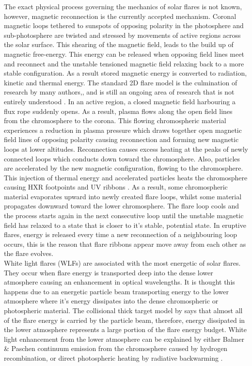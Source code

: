 The exact physical process governing the mechanics of solar flares is not known, however, magnetic reconnection is the currently accepted mechanism. Coronal magnetic loops tethered to sunspots of opposing polarity in the photosphere and sub-photosphere are twisted and stressed by movements of active regions across the solar surface. This shearing of the magnetic field, leads to the build up of magnetic free-energy. This energy can be released when opposing field lines meet and reconnect and the unstable tensioned magnetic field relaxing back to a more stable configuration. As a result stored magnetic energy is converted to radiation, kinetic and thermal energy. The standard 2D flare model is the culmination of research by many authors,\citep{1964NASSP..50..451C, 1966Natur.211..695S, 1974SoPh...34..323H, 1976SoPh...50...85K}, and is still an ongoing area of research that is not entirely understood \citep{2011LRSP....8....6S}. In an active region, a closed magnetic field harbouring a flux rope suddenly opens. As a result, plasma flows along the open field lines from the chromosphere to the corona. This flowing chromospheric material experiences a reduction in plasma pressure which draws together open magnetic field lines of opposing polarity causing reconnection and forming new magnetic loops at lower altitudes. Reconnection causes excess heating at the peaks of newly connected loops which conducts down toward the chromosphere. Also, particles are accelerated by the new magnetic configuration, flowing to the chromosphere. This injection of thermal energy and accelerated particles heats the chromosphere causing HXR footpoints \citep{1995ApJ...455..347A} and UV ribbons \citep{2009A&A...493..241F}. As a result, some chromospheric material evaporates upward into newly created flare loops, whilst some material propagates downward toward the lower chromosphere. The flare loop cools and the process starts again in the next consecutive loop until the unstable magnetic field has relaxed to a state that is closer to it's stable,  potential state. In eruptive flares, energy is released every time a new reconnection of a neighbouring loop occurs, this is the reason that flare ribbons appear move away from each other as the flare evolves. \\
White light flares (WLFs) are associated with the most energetic of solar flares. They occur when flare energy is transported deep into the dense lower atmosphere causing an enhancement in optical wavelengths. It is thought this happens due to an energetic particle beam transporting energy to the lower atmosphere where it's energy dissipates into the dense chromospheric or photospheric material. The collisional thick target model by \cite{1971SoPh...18..489B} says that almost all of the flare energy is carried by the particle beam, therefore, energy dissipated in the lower atmosphere represents a large portion of the flare energy budget. White light enhancement from the lower atmosphere can be explained by either Balmer \& Paschen continuum emission from the chromosphere caused by hydrogen recombination, or direct photospheric heating \citep{2007ASPC..368..417D} by radiative backwarming \citep{1989SoPh..124..303M}.


